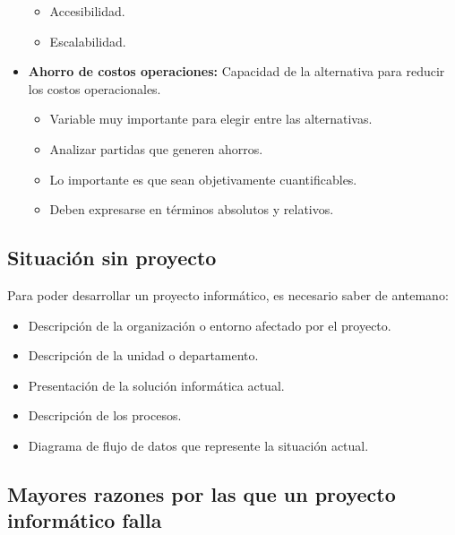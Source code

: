 \documentclass{templateNote}
\begin{document}
\begin{itemize}
\begin{itemize}
        \item Accesibilidad.
        \item Escalabilidad.
    \end{itemize}
    \item \textbf{Ahorro de costos operaciones:} Capacidad de la alternativa para reducir los costos operacionales.
    \begin{itemize}
        \item Variable muy importante para elegir entre las alternativas.
        \item Analizar partidas que generen ahorros.
        \item Lo importante es que sean objetivamente cuantificables.
        \item Deben expresarse en términos absolutos y relativos.
    \end{itemize}
\end{itemize}

\subsection*{Situación sin proyecto}
Para poder desarrollar un proyecto informático, es necesario saber de antemano:
\begin{itemize}
    \item Descripción de la organización o entorno afectado por el proyecto.
    \item Descripción de la unidad o departamento.
    \item Presentación de la solución informática actual.
    \item Descripción de los procesos.
    \item Diagrama de flujo de datos que represente la situación actual.
\end{itemize}

\subsection*{Mayores razones por las que un proyecto informático falla}\label{sec:razones-falla}
\end{document}
